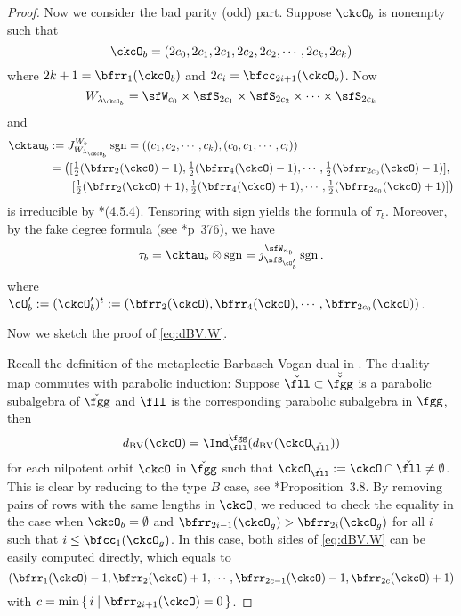 \documentclass[12pt,a4paper]{amsart}
\newcommand{\sgn}{\operatorname{sgn}}
\numberwithin{equation}{section}
\theoremstyle{remark}
\def\half{{\tfrac{1}{2}}}
\def\dBV{d_{\mathrm{BV}}}
\def\lamckb{\lambda_{\ckcO_b}}
\def\ckfgg{{\check \fgg}}
\begin{document}
\begin{proof}
  Now we consider the bad parity (odd) part.
  Suppose $\ckcO_{b}$ is nonempty such that
  \[
    \ckcO_{b} = (2c_{0},2c_{1}, 2c_{1}, 2c_{2},2c_{2}, \cdots, 2c_{k}, 2c_{k})
  \]
  where $2k+1=\bfrr_{1}(\ckcO_{b})$ and $2c_{i} = \bfcc_{2i+1}(\ckcO_{b})$.
  Now
  \[
    W_{\lamckb} = \sfW_{c_{0}} \times \sfS_{2c_{1}} \times \sfS_{2c_{2}}\times \cdots \times \sfS_{2c_{k}}
  \]
  and %
  \[
    \begin{split}
      \cktau_{b} &:= J_{W_{\lamckb}}^{W_{b}} \sgn
      = ((c_{1},c_{2},\cdots, c_{k}),(c_{0},c_{1}, \cdots, c_{l}))\\
      & = \big([\half(\bfrr_{2}(\ckcO)-1),\half(\bfrr_{4}(\ckcO)-1),\cdots, \half(\bfrr_{2c_{0}}(\ckcO)-1)],\\
      & \hspace{2em}
      [\half(\bfrr_{2}(\ckcO)+1),\half(\bfrr_{4}(\ckcO)+1),\cdots, \half(\bfrr_{2c_{0}}(\ckcO)+1)]\big)
    \end{split}
  \]
  is irreducible by \cite{Lu}*{(4.5.4)}.
  Tensoring with sign yields the formula of $\tau_{b}$. Moreover,
  by the fake degree formula (see \cite{Carter}*{p~376}), we have
\[
    \tau_{b} = \cktau_{b}\otimes \sgn
      = j_{\sfS_{\cO'_{b}}}^{\sfW_{n_{b}}} \sgn.
\]
where
$ \cO'_{b} := (\ckcO'_{b})^{t}:=(\bfrr_{2}(\ckcO),\bfrr_{4}(\ckcO),\cdots , \bfrr_{2c_{0}}(\ckcO))$.

\medskip
\def\ckfll{\check{\fll}}

Now we sketch the proof of \eqref{eq:dBV.W}.

Recall the definition of the metaplectic Barbasch-Vogan dual in \cite{BMSZ1}.
The duality map commutes with parabolic induction:
Suppose $\ckfll\subset \check \ckfgg$ is a parabolic subalgebra of $\ckfgg$ and
$\fll$ is the corresponding parabolic subalgebra in $\fgg$, then
\begin{equation}\label{eq:inddBV}
 \dBV(\ckcO) =  \Ind_{\fll}^{\fgg}(\dBV(\ckcO_{\ckfll}))
\end{equation}
for each nilpotent orbit $\ckcO$ in $\ckfgg$ such that
$\ckcO_{\ckfll}:=\ckcO\cap \ckfll\neq \emptyset$. This is clear by reducing to
the type $B$ case, see \cite{BMSZ1}*{Proposition~3.8}. By removing pairs of rows
with the same lengths in $\ckcO$, we reduced to check the equality in the case
when $\ckcO_{b}=\emptyset$ and $\bfrr_{2i-1}(\ckcO_{g})>\bfrr_{2i}(\ckcO_{g})$
for all $i$ such that $i\leq \bfcc_{1}(\ckcO_{g})$. In this case, both sides of
\eqref{eq:dBV.W} can be easily computed directly, which equals to
\[
  (\bfrr_{1}(\ckcO)-1, \bfrr_{2}(\ckcO)+1, \cdots,\bfrr_{2c-1}(\ckcO)-1,\bfrr_{2c}(\ckcO)+1)
\]
with $c = \min\set{i|\bfrr_{2i+1}(\ckcO)=0}$.


\end{proof}
\end{document}
